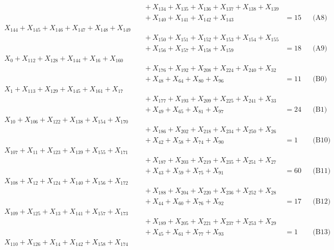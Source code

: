 \documentclass[a4paper,10pt]{article}
\begin{document}
{\begin{align}
&\quad  + X_{134} + X_{135} + X_{136} + X_{137} + X_{138} + X_{139} \\[0.5ex]
&\quad  + X_{140} + X_{141} + X_{142} + X_{143} &= 15 && \text{(A8)} \\
X_{144} + X_{145} + X_{146} + X_{147} + X_{148} + X_{149} \\[0.5ex]
&\quad  + X_{150} + X_{151} + X_{152} + X_{153} + X_{154} + X_{155} \\[0.5ex]
&\quad  + X_{156} + X_{157} + X_{158} + X_{159} &= 18 && \text{(A9)} \\
X_{0} + X_{112} + X_{128} + X_{144} + X_{16} + X_{160} \\[0.5ex]
&\quad  + X_{176} + X_{192} + X_{208} + X_{224} + X_{240} + X_{32} \\[0.5ex]
&\quad  + X_{48} + X_{64} + X_{80} + X_{96} &= 11 && \text{(B0)} \\
X_{1} + X_{113} + X_{129} + X_{145} + X_{161} + X_{17} \\[0.5ex]
&\quad  + X_{177} + X_{193} + X_{209} + X_{225} + X_{241} + X_{33} \\[0.5ex]
&\quad  + X_{49} + X_{65} + X_{81} + X_{97} &= 24 && \text{(B1)} \\
X_{10} + X_{106} + X_{122} + X_{138} + X_{154} + X_{170} \\[0.5ex]
&\quad  + X_{186} + X_{202} + X_{218} + X_{234} + X_{250} + X_{26} \\[0.5ex]
&\quad  + X_{42} + X_{58} + X_{74} + X_{90} &= 1 && \text{(B10)} \\
X_{107} + X_{11} + X_{123} + X_{139} + X_{155} + X_{171} \\[0.5ex]
&\quad  + X_{187} + X_{203} + X_{219} + X_{235} + X_{251} + X_{27} \\[0.5ex]
&\quad  + X_{43} + X_{59} + X_{75} + X_{91} &= 60 && \text{(B11)} \\
\allowbreak
X_{108} + X_{12} + X_{124} + X_{140} + X_{156} + X_{172} \\[0.5ex]
&\quad  + X_{188} + X_{204} + X_{220} + X_{236} + X_{252} + X_{28} \\[0.5ex]
&\quad  + X_{44} + X_{60} + X_{76} + X_{92} &= 17 && \text{(B12)} \\
X_{109} + X_{125} + X_{13} + X_{141} + X_{157} + X_{173} \\[0.5ex]
&\quad  + X_{189} + X_{205} + X_{221} + X_{237} + X_{253} + X_{29} \\[0.5ex]
&\quad  + X_{45} + X_{61} + X_{77} + X_{93} &= 1 && \text{(B13)} \\
X_{110} + X_{126} + X_{14} + X_{142} + X_{158} + X_{174} \\[0.5ex]

\end{align}}
\end{document}
